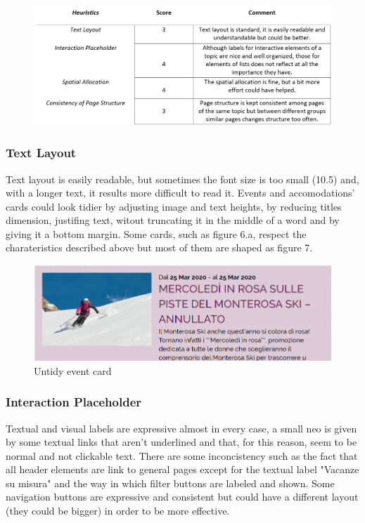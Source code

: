 \begin{figure}[h!]
	\centering
	\begin{minipage}[b]{1\textwidth}
    		\includegraphics[width=\textwidth]{./assets/layout-final.PNG}
	\end{minipage}
\end{figure}
\FloatBarrier

\subsubsection{Text Layout}
Text layout is easily readable, but sometimes the font size is too small (10.5) and, with a longer text, it results more difficult to read it. Events and accomodations' cards could look tidier by adjusting image and text heights, by reducing titles dimension, justifing text, witout truncating it in the middle of a word and by giving it a bottom margin. Some cards, such as figure 6.a, respect the charateristics described above but most of them are shaped as figure 7.

\begin{figure}[h!]
	\centering
	\begin{minipage}[b]{1\textwidth}
    		\includegraphics[width=\textwidth]{./assets/event.png}
		\caption{Untidy event card}
	\end{minipage}
\end{figure}
\FloatBarrier

\subsubsection{Interaction Placeholder}
Textual and visual labels are expressive almost in every case, a small neo is given by some textual links that aren't underlined and that, for this reason, seem to be normal and not clickable text. There are some inconcistency such as the fact that all header elements are link to general pages except for the textual label "Vacanze su misura" and the way in which filter buttons are labeled and shown. Some navigation buttons are expressive and consistent but could have a different layout (they could be bigger) in order to be more effective.

